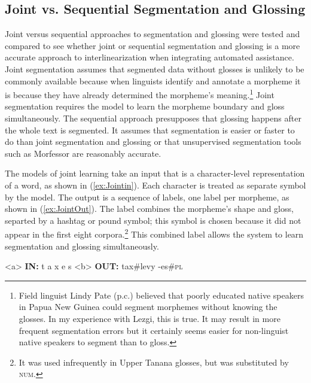

\subsection{Joint vs. Sequential Segmentation and Glossing}
\label{sec:sgjoint}

Joint versus sequential approaches to segmentation and glossing were tested and compared to see whether joint or sequential segmentation and glossing is a more accurate approach to interlinearization when integrating automated assistance. Joint segmentation assumes that segmented data without glosses is unlikely to be commonly available because when linguists identify and annotate a morpheme it is because they have already determined the morpheme's meaning.\footnote{Field linguist Lindy Pate (p.c.) believed that poorly educated native speakers in Papua New Guinea could segment morphemes without knowing the glosses. In my experience with Lezgi, this is true. It may result in more frequent segmentation errors but it certainly seems easier for non-linguist native speakers to segment than to gloss.} 
Joint segmentation requires the model to learn the morpheme boundary and gloss simultaneously. The sequential approach presupposes that glossing happens after the whole text is segmented. It assumes that segmentation is easier or faster to do than joint segmentation and glossing or that unsupervised segmentation tools such as Morfessor \citep{smit-etal-2014-morfessor} are reasonably accurate.

The models of joint learning take an input that is a character-level representation of a word, as shown in (\ref{ex:Jointin}). Each character is treated as separate symbol by the model. The output is a sequence of labels, one label per morpheme, as shown in (\ref{ex:JointOut}). The label combines the morpheme's shape and gloss, separted by a hashtag or pound symbol; this symbol is chosen because it did not appear in the first eight corpora.\footnote{It was used infrequently in Upper Tanana glosses, but was substituted by \textsc{num}.} This combined label allows the system to learn segmentation and glossing simultaneously. 

\pex   
\label{ex:JointInOut}
\a<a> \textbf{IN:} \hspace{6 mm} t \hspace{2 mm} a \hspace{2 mm} x \hspace{2 mm} e \hspace{2 mm} s 
\label{ex:Jointin}
\a<b> \textbf{OUT:} \hspace{2 mm} tax\#levy \hspace{3 mm} -es\#\textsc{pl} 
\label{ex:JointOut}
\xe

